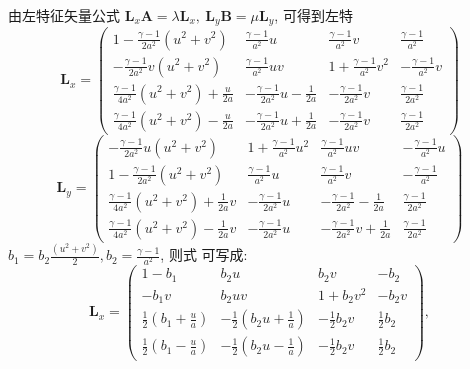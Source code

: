 \documentclass[12pt]{article}
\begin{document}
由左特征矢量公式 $ \bm{L}_{x} \bm{A}=\lambda \bm{L}_{x},\ \bm{L}_{y} \bm{B}=\mu \bm{L}_{y}$,  可得到左特
\begin{equation}
	\bm{L}_{x}=\left(\begin{array}{cccc}
			1-\frac{\gamma-1}{2 a^{2}}\left(u^{2}+v^{2}\right)             & \frac{\gamma-1}{a^{2}} u                  & \frac{\gamma-1}{a^{2}} v       & \frac{\gamma-1}{a^{2}}    \\
			-\frac{\gamma-1}{2 a^{2}} v\left(u^{2}+v^{2}\right)            & \frac{\gamma-1}{a^{2}} u v                & 1+\frac{\gamma-1}{a^{2}} v^{2} & -\frac{\gamma-1}{a^{2}} v \\
			\frac{\gamma-1}{4 a^{2}}\left(u^{2}+v^{2}\right)+\frac{u}{2 a} & -\frac{\gamma-1}{2 a^{2}} u-\frac{1}{2 a} & -\frac{\gamma-1}{2 a^{2}} v    & \frac{\gamma-1}{2 a^{2}}  \\
			\frac{\gamma-1}{4 a^{2}}\left(u^{2}+v^{2}\right)-\frac{u}{2 a} & -\frac{\gamma-1}{2 a^{2}} u+\frac{1}{2 a} & -\frac{\gamma-1}{2 a^{2}} v    & \frac{\gamma-1}{2 a^{2}}
		\end{array}\right)
\end{equation}
\begin{equation}
	\bm{L}_{y}=\left(\begin{array}{cccc}
			-\frac{\gamma-1}{2 a^{2}} u\left(u^{2}+v^{2}\right)              & 1+\frac{\gamma-1}{a^{2}} u^{2} & \frac{\gamma-1}{a^{2}} u v                & -\frac{\gamma-1}{a^{2}} u \\
			1-\frac{\gamma-1}{2 a^{2}}\left(u^{2}+v^{2}\right)               & \frac{\gamma-1}{a^{2}} u       & \frac{\gamma-1}{a^{2}} v                  & -\frac{\gamma-1}{a^{2}}   \\
			\frac{\gamma-1}{4 a^{2}}\left(u^{2}+v^{2}\right)+\frac{1}{2 a} v & -\frac{\gamma-1}{2 a^{2}} u    & -\frac{\gamma-1}{2 a^{2}}-\frac{1}{2 a}   & \frac{\gamma-1}{2 a^{2}}  \\
			\frac{\gamma-1}{4 a^{2}}\left(u^{2}+v^{2}\right)-\frac{1}{2 a} v & -\frac{\gamma-1}{2 a^{2}} u    & -\frac{\gamma-1}{2 a^{2}} v+\frac{1}{2 a} & \frac{\gamma-1}{2 a^{2}}
		\end{array}\right)
\end{equation}
$b_{1}=b_{2} \frac{\left(u^{2}+v^{2}\right)}{2}, b_{2}=\frac{\gamma-1}{a^{2}}$,  则式   可写成:
\begin{equation}
	\bm{L}_{x}=\left(\begin{array}{cccc}
			1-b_{1}                                   & b_{2} u                                      & b_{2} v              & -b_{2}            \\
			-b_{1} v                                  & b_{2} u v                                    & 1+b_{2} v^{2}        & -b_{2} v          \\
			\frac{1}{2}\left(b_{1}+\frac{u}{a}\right) & -\frac{1}{2}\left(b_{2} u+\frac{1}{a}\right) & -\frac{1}{2} b_{2} v & \frac{1}{2} b_{2} \\
			\frac{1}{2}\left(b_{1}-\frac{u}{a}\right) & -\frac{1}{2}\left(b_{2} u-\frac{1}{a}\right) & -\frac{1}{2} b_{2} v & \frac{1}{2} b_{2}
		\end{array}\right),
\end{equation}
\end{document}
